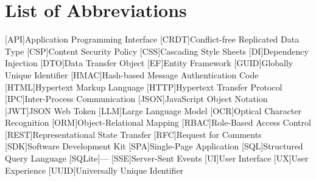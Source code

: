 \cleardoublepage
{}
\tableofcontents
\clearpage

\cleardoublepage
{}
{}
\chapter*{List of Abbreviations}
\begin{acronym}[\hspace{3cm}]
  [API]{Application Programming Interface}
  [CRDT]{Conflict-free Replicated Data Type}
  [CSP]{Content Security Policy}
  [CSS]{Cascading Style Sheets}
  [DI]{Dependency Injection}
  [DTO]{Data Transfer Object}
  [EF]{Entity Framework}
  [GUID]{Globally Unique Identifier}
  [HMAC]{Hash-based Message Authentication Code}
  [HTML]{Hypertext Markup Language}
  [HTTP]{Hypertext Transfer Protocol}
  [IPC]{Inter-Process Communication}
  [JSON]{JavaScript Object Notation}
  [JWT]{JSON Web Token}
  [LLM]{Large Language Model}
  [OCR]{Optical Character Recognition}
  [ORM]{Object-Relational Mapping}
  [RBAC]{Role-Based Access Control}
  [REST]{Representational State Transfer}
  [RFC]{Request for Comments}
  [SDK]{Software Development Kit}
  [SPA]{Single-Page Application}
  [SQL]{Structured Query Language}
  [SQLite]{---}
  [SSE]{Server-Sent Events}
  [UI]{User Interface}
  [UX]{User Experience}
  [UUID]{Universally Unique Identifier}
\end{acronym}
\clearpage

\cleardoublepage
{}
{}
\listoffigures
\clearpage

\cleardoublepage
{}
{}
\listoftables
\clearpage
